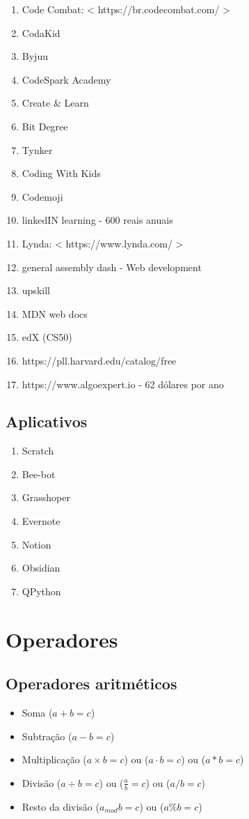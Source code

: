 \documentclass[12pt,a4paper]{article} %
\begin{document}
\begin{enumerate}
\item Code Combat: < https://br.codecombat.com/ >
\item CodaKid
\item Byjuu
\item CodeSpark Academy
\item Create \& Learn
\item Bit Degree
\item Tynker
\item Coding With Kids
\item Codemoji
\item linkedIN learning - 600 reais anuais
\item Lynda: < https://www.lynda.com/ >
\item general assembly dash - Web development
\item upskill
\item MDN web docs
\item edX (CS50)
\item https://pll.harvard.edu/catalog/free
\item https://www.algoexpert.io - 62 dólares por ano
\end{enumerate}

\subsection{Aplicativos}
\begin{enumerate}
\item Scratch
\item Bee-bot
\item Grasshoper
\item Evernote
\item Notion
\item Obsidian
\item QPython
\end{enumerate}

\section{Operadores}

\subsection{Operadores aritméticos}
\begin{itemize}
\item Soma ($a + b = c$)
\item Subtração ($a - b = c$)
\item Multiplicação ($a \times b = c$) ou ($a \cdot b = c$) ou ($a * b = c$)
\item Divisão ($a \div b = c$) ou ($\frac{a}{b} = c$) ou ($a/b = c$)
\item Resto da divisão ($a _{mod}b = c$) ou ($a \% b = c$)
\end{itemize}
\end{document}
